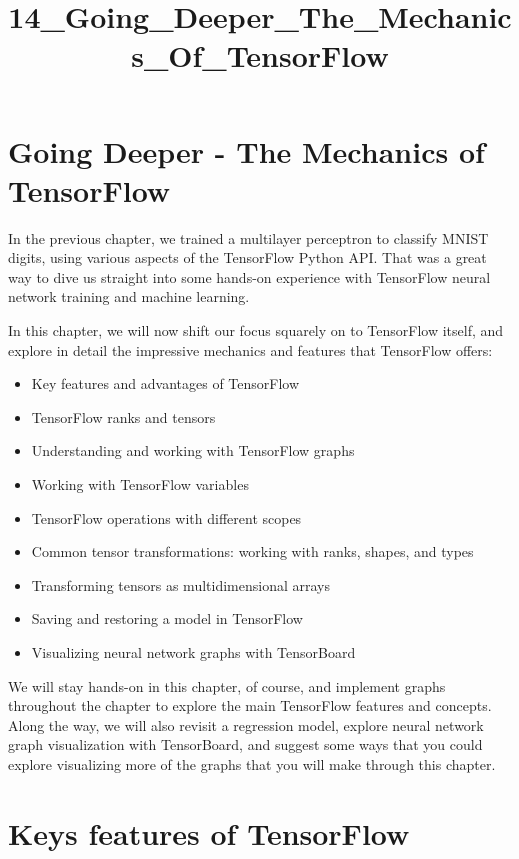 \documentclass[11pt]{article}
\title{14\_Going\_Deeper\_The\_Mechanics\_Of\_TensorFlow}
\providecommand{\tightlist}{%
      \setlength{\itemsep}{0pt}\setlength{\parskip}{0pt}}
\begin{document}
    
    
    \maketitle
    
    

    
    \section{Going Deeper - The Mechanics of
TensorFlow}\label{going-deeper---the-mechanics-of-tensorflow}

    In the previous chapter, we trained a multilayer perceptron to classify
MNIST digits, using various aspects of the TensorFlow Python API. That
was a great way to dive us straight into some hands-on experience with
TensorFlow neural network training and machine learning.

In this chapter, we will now shift our focus squarely on to TensorFlow
itself, and explore in detail the impressive mechanics and features that
TensorFlow offers:

\begin{itemize}
\tightlist
\item
  Key features and advantages of TensorFlow
\item
  TensorFlow ranks and tensors
\item
  Understanding and working with TensorFlow graphs
\item
  Working with TensorFlow variables
\item
  TensorFlow operations with different scopes
\item
  Common tensor transformations: working with ranks, shapes, and types
\item
  Transforming tensors as multidimensional arrays
\item
  Saving and restoring a model in TensorFlow
\item
  Visualizing neural network graphs with TensorBoard
\end{itemize}

We will stay hands-on in this chapter, of course, and implement graphs
throughout the chapter to explore the main TensorFlow features and
concepts. Along the way, we will also revisit a regression model,
explore neural network graph visualization with TensorBoard, and suggest
some ways that you could explore visualizing more of the graphs that you
will make through this chapter.

    \section{Keys features of TensorFlow}\label{keys-features-of-tensorflow}
\end{document}
